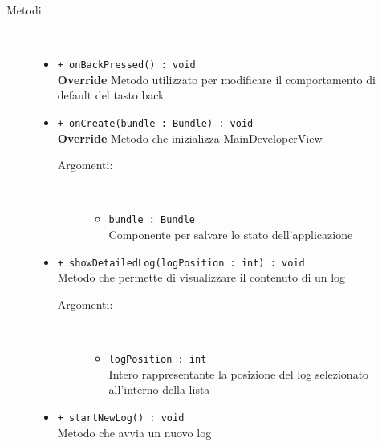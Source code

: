 \documentclass[../DefinizioneDiProdotto.tex]{subfiles}
\begin{document}
\begin{description}
\begin{itemize}
	\end{itemize}
	\item[Metodi:] \
	\begin{itemize}
		\item \texttt{+ onBackPressed() : void}\\
		\textbf{Override} Metodo utilizzato per modificare il comportamento di default del tasto back
		\item \texttt{+ onCreate(bundle : Bundle) : void}\\
		\textbf{Override} Metodo che inizializza MainDeveloperView
		\begin{description}
			\item[Argomenti:] \
			\begin{itemize}
				\item \texttt{bundle : Bundle}\\
				Componente per salvare lo stato dell'applicazione\end{itemize}
		\end{description}
		\item \texttt{+ showDetailedLog(logPosition  : int) : void}\\
		Metodo che permette di visualizzare il contenuto di un log
		\begin{description}
			\item[Argomenti:] \
			\begin{itemize}
				\item \texttt{logPosition  : int}\\
				Intero rappresentante la posizione del log selezionato all'interno della lista\end{itemize}
		\end{description}
		\item \texttt{+ startNewLog() : void}\\
		Metodo che avvia un nuovo log
	\end{itemize}
\end{description}
\end{document}
